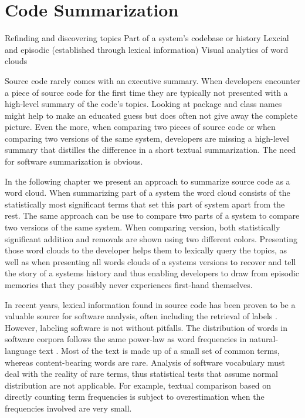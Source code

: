 \chapter{Code Summarization}
\label{the chapter on LogLR}

\infobox
	{Refinding and discovering topics}
	{Part of a system's codebase or history}
	{Lexcial and episodic (established through lexical information)}
	{Visual analytics of word clouds}

Source code rarely comes with an executive summary. When developers encounter a piece of source code for the first time they are typically not presented with a high-level summary of the code's topics. Looking at package and class names might help to make an educated guess but does often not give away the complete picture. Even the more, when comparing two pieces of source code or when comparing two versions of the same system, developers are missing a high-level summary that distilles the difference in a short textual summarization. The need for software summarization is obvious.

In the following chapter we present an approach to summarize source code as a word cloud. When summarizing part of a system the word cloud consists of the statistically most significant terms that set this part of system apart from the rest. The same approach can be use to compare two parts of a system to compare two versions of the same system. When comparing version, both statistically significant addition and removals are shown using two different colors. Presenting those word clouds to the developer helps them to lexically query the topics, as well as when presenting all words clouds of a systems versions to recover and tell the story of a systems history and thus enabling developers to draw from episodic memories that they possibly never experiences first-hand themselves.

\asteriskasteriskasterisk


In recent years, lexical information found in source code has been proven to be a valuable source for software analysis, often including the retrieval of labels \cite{Baldi08OOPSLA,EinarHoest,Kuhn07a}. However, labeling software is not without pitfalls. The distribution of words in software corpora follows the same power-law as word frequencies in natural-language text \cite{Linstead09SUITE}. Most of the text is made up of a small set of common terms, whereas content-bearing words are rare. Analysis of software vocabulary must deal with the reality of rare terms, thus statistical tests that assume normal distribution are not applicable. For example, textual comparison based on directly counting term frequencies is subject to overestimation when the frequencies involved are very small.  

